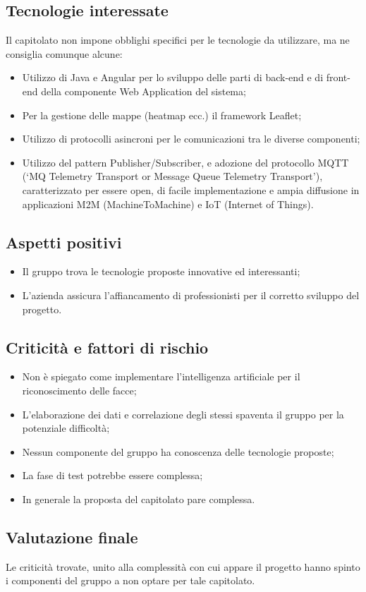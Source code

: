 \subsection{Tecnologie interessate}
Il capitolato non impone obblighi specifici per le tecnologie da utilizzare, ma ne consiglia comunque alcune:
\begin{itemize}
\item Utilizzo di Java e Angular per lo sviluppo delle parti di back-end e di front-end della componente Web
Application del sistema;
\item Per la gestione delle mappe (heatmap ecc.) il framework Leaflet;
\item Utilizzo di protocolli asincroni per le comunicazioni tra le diverse componenti;
\item Utilizzo del pattern Publisher/Subscriber, e adozione del protocollo MQTT (‘MQ Telemetry Transport
or Message Queue Telemetry Transport’), caratterizzato per essere open, di facile implementazione
e ampia diffusione in applicazioni M2M (MachineToMachine) e IoT (Internet of Things).
\end{itemize}

\subsection{Aspetti positivi}
\begin{itemize}
\item Il gruppo trova le tecnologie proposte innovative ed interessanti;
\item L'azienda assicura l'affiancamento di professionisti per il corretto sviluppo del progetto.
\end{itemize}

\subsection{Criticità e fattori di rischio}
\begin{itemize}
\item Non è spiegato come implementare l'intelligenza artificiale per il riconoscimento delle facce;
\item L'elaborazione dei dati e correlazione degli stessi spaventa il gruppo per la potenziale difficoltà;
\item Nessun componente del gruppo ha conoscenza delle tecnologie proposte;
\item La fase di test potrebbe essere complessa;
\item In generale la proposta del capitolato pare complessa.
\end{itemize}

\subsection{Valutazione finale}
Le criticità trovate, unito alla complessità con cui appare il progetto hanno spinto i componenti del gruppo a non optare per tale capitolato.
